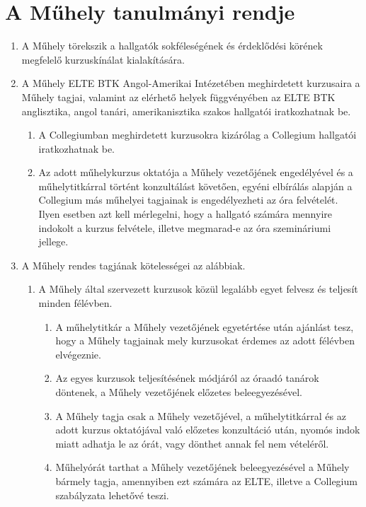 \documentclass{../styles/rulebook}
\begin{document}
\section{A Műhely tanulmányi rendje}

\begin{enumerate}
	\item A Műhely törekszik a hallgatók sokféleségének és érdeklődési körének megfelelő
	kurzuskínálat kialakítására.
	\item A Műhely ELTE BTK Angol-Amerikai Intézetében meghirdetett kurzusaira a
	Műhely tagjai, valamint az elérhető helyek függvényében az ELTE BTK anglisztika,
	angol tanári, amerikanisztika szakos hallgatói iratkozhatnak be. 
	\begin{enumerate}
		\item A Collegiumban
		meghirdetett kurzusokra kizárólag a Collegium hallgatói iratkozhatnak be.
		\item  Az adott
		műhelykurzus oktatója a Műhely vezetőjének engedélyével és a műhelytitkárral
		történt konzultálást követően, egyéni elbírálás alapján a Collegium más műhelyei
		tagjainak is engedélyezheti az óra felvételét. Ilyen esetben azt kell mérlegelni, hogy a	hallgató számára mennyire indokolt a kurzus felvétele, illetve megmarad-e az óra
		szemináriumi jellege.
	\end{enumerate}
	\item A Műhely rendes tagjának kötelességei az alábbiak.
	\begin{enumerate}
		\item A Műhely által szervezett kurzusok közül legalább egyet felvesz és teljesít minden félévben.
		\begin{enumerate}
			\item A műhelytitkár a Műhely vezetőjének egyetértése után ajánlást tesz, hogy a Műhely tagjainak mely kurzusokat érdemes az adott félévben elvégeznie.
			\item Az egyes kurzusok teljesítésének módjáról az óraadó tanárok döntenek, a	Műhely vezetőjének előzetes beleegyezésével.
			\item A Műhely tagja csak a Műhely vezetőjével, a műhelytitkárral és az adott kurzus
			oktatójával való előzetes konzultáció után, nyomós indok miatt adhatja le az
			órát, vagy dönthet annak fel nem vételéről.
			\item Műhelyórát tarthat a Műhely vezetőjének beleegyezésével a Műhely bármely
			tagja, amennyiben ezt számára az ELTE, illetve a Collegium szabályzata
			lehetővé teszi.
		\end{enumerate}

\end{enumerate}
\end{enumerate}
\end{document}
